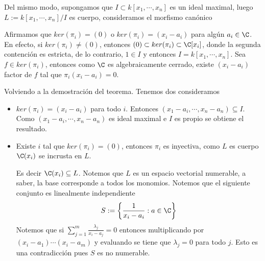 \documentclass{article}
\begin{document}
\begin{dem}
    Del mismo modo, supongamos que $I\subset k[x_{1},\cdots,x_{n}]$ es un ideal maximal, luego
    $L:=k[x_{1},\cdots,x_{n}]/I$ es cuerpo, consideramos el morfismo canónico 
    \vspace{2mm}

    \centerline{
    }
    \vspace{2mm}

    Afirmamos que $ker(\pi_{i})=(0)$ o $ker(\pi_{i})=(x_{i}-a_{i})$ para algún 
    $a_{i}\in\C$. En efecto, si $ker(\pi_{i})\neq(0)$, entonces $(0)\subset ker(\pi_{i})
    \subset\C[x_{i}]$, donde la segunda contención es estricta, de lo contrario, $1\in I$ y
    entonces $I=k[x_{1},\cdots,x_{n}]$. Sea $f\in ker(\pi_{i})$, entonces como $\C$ es 
    algebraicamente cerrado, existe $(x_{i}-a_{i})$ factor de $f$ tal que $\pi_{i}(x_{i}-a_{i})=0$.
    \vspace{4mm}

    \noindent Volviendo a la demostración del teorema. Tenemos dos consideramos
    \begin{itemize}
        \item $ker(\pi_{i})=(x_{i}-a_{i})$ para todo $i$. Entonces $(x_{1}-a_{i},\cdots,
        x_{n}-a_{n})\subseteq I$. Como $(x_{1}-a_{i},\cdots,x_{n}-a_{n})$ es ideal maximal e $I$ es
        propio se obtiene el resultado.

        \item Existe $i$ tal que $ker(\pi_{i})=(0)$, entonces $\pi_{i}$ es inyectiva, como $L$ es
        cuerpo $\C(x_{i})$ se incrusta en $L$.
        \vspace{2mm}

        \centerline{
        }
        \vspace{2mm}

        \noindent Es decir $\C(x_{i})\subseteq L$. Notemos que $L$ es un espacio vectorial 
        numerable, a saber, la base corresponde a todos los monomios. Notemos que el siguiente 
        conjunto es linealmente independiente
        \begin{equation*}
            S:=\left\{\frac{1}{x_{i}-a_{i}}:a\in\C\right\}
        \end{equation*}
        Notemos que si $\sum_{j=1}^{m}\frac{\lambda_{j}}{x_{i}-a_{j}}=0$ entonces multiplicando 
        por $(x_{i}-a_{1})\cdots(x_{i}-a_{m})$ y evaluando se tiene que $\lambda_{j}=0$ para todo 
        $j$. Esto es una contradicción pues $S$ es no numerable.
    \end{itemize}
\end{dem}
\end{document}
